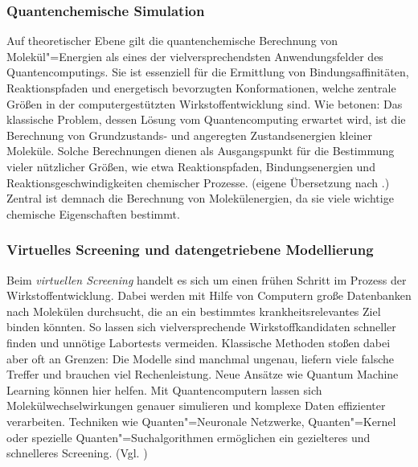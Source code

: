 \subsubsection*{Quantenchemische Simulation}
Auf theoretischer Ebene gilt die quantenchemische Berechnung von Molekül"=Energien als eines der vielversprechendsten Anwendungsfelder des Quantencomputings. Sie ist essenziell für die Ermittlung von Bindungsaffinitäten, Reaktionspfaden und energetisch bevorzugten Konformationen, welche zentrale Größen in der computergestützten Wirkstoffentwicklung sind. Wie \cite{cao_quantum_2019} betonen: Das klassische Problem, dessen Lösung vom Quantencomputing erwartet wird, ist die Berechnung von Grundzustands- und angeregten Zustandsenergien kleiner Moleküle. Solche Berechnungen dienen als Ausgangspunkt für die Bestimmung vieler nützlicher Größen, wie etwa Reaktionspfaden, Bindungsenergien und Reaktionsgeschwindigkeiten chemischer Prozesse. (eigene Übersetzung nach \cite{cao_quantum_2019}.) Zentral ist demnach die Berechnung von Molekülenergien, da sie viele wichtige chemische Eigenschaften bestimmt.

\subsubsection*{Virtuelles Screening und datengetriebene Modellierung}
Beim \textit{virtuellen Screening} handelt es sich um einen frühen Schritt im Prozess der Wirkstoffentwicklung. Dabei werden mit Hilfe von Computern große Datenbanken nach Molekülen durchsucht, die an ein bestimmtes krankheitsrelevantes Ziel binden könnten. So lassen sich vielversprechende Wirkstoffkandidaten schneller finden und unnötige Labortests vermeiden. Klassische Methoden stoßen dabei aber oft an Grenzen: Die Modelle sind manchmal ungenau, liefern viele falsche Treffer und brauchen viel Rechenleistung. Neue Ansätze wie Quantum Machine Learning können hier helfen. Mit Quantencomputern lassen sich Molekülwechselwirkungen genauer simulieren und komplexe Daten effizienter verarbeiten. Techniken wie Quanten"=Neuronale Netzwerke, Quanten"=Kernel oder spezielle Quanten"=Suchalgorithmen ermöglichen ein gezielteres und schnelleres Screening. (Vgl. \cite{kumar_recent_2024})


